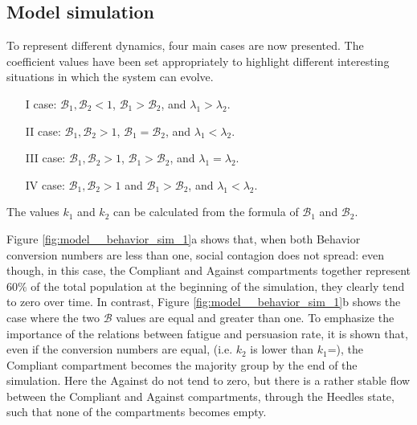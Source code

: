 \subsection{Model simulation}
To represent different dynamics, four main cases are now presented. The coefficient values have been set appropriately to highlight different interesting situations in which the system can evolve.

\begin{itemize}
	\item[I] case: $\mathcal{B}_1, \mathcal{B}_2 <1$, $\mathcal{B}_1 >  \mathcal{B}_2$, and $\lambda_1 > \lambda_2$.
	\item[II] case: $\mathcal{B}_1, \mathcal{B}_2 >1$, $\mathcal{B}_1 =  \mathcal{B}_2$, and $\lambda_1 < \lambda_2$.
	\item[III] case: $\mathcal{B}_1, \mathcal{B}_2 >1$, $\mathcal{B}_1 >  \mathcal{B}_2$, and $\lambda_1 = \lambda_2$.
	\item[IV] case: $\mathcal{B}_1, \mathcal{B}_2 >1$ and $\mathcal{B}_1 >  \mathcal{B}_2$, and $\lambda_1 < \lambda_2$.
\end{itemize}

The values $k_1$ and $k_2$ can be calculated from the formula of $\mathcal{B}_1$ and $\mathcal{B}_2$.

Figure \ref{fig:model__behavior_sim_1}a shows that, when both Behavior conversion numbers are less than one, social contagion does not spread: even though, in this case, the Compliant and Against compartments together represent $60\%$ of the total population at the beginning of the simulation, they clearly tend to zero over time. In contrast, Figure \ref{fig:model__behavior_sim_1}b shows the case where the two $\mathcal{B}$ values are equal and greater than one. To emphasize the importance of the relations between fatigue and persuasion rate, it is shown that, even if the conversion numbers are equal, (i.e. $k_2$  is lower than $k_1$=), the Compliant compartment becomes the majority group by the end of the simulation. Here the Against do not tend to zero, but there is a rather stable flow between the Compliant and Against compartments, through the Heedles state, such that
none of the compartments becomes empty.

